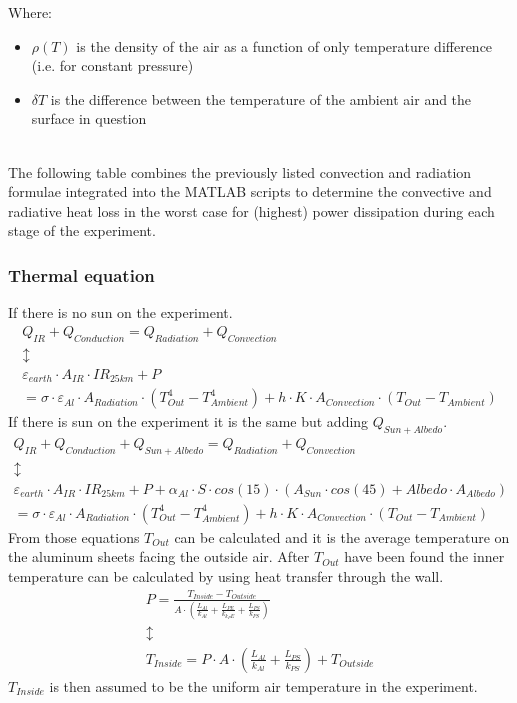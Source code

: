 Where:
\begin{itemize}
    \item $\rho(T)$ is the density of the air as a function of only temperature difference (i.e. for constant pressure)
    \item $\delta T$ is the difference between the temperature of the ambient air and the surface in question
\end{itemize} \\



The following table combines the previously listed convection and radiation formulae integrated into the MATLAB scripts to determine the convective and radiative heat loss in the worst case for (highest) power dissipation during each stage of the experiment.\\



\raggedbottom


\subsubsection{Thermal equation}
If there is no sun on the experiment.
\begin{gather*}
    Q_{IR} + Q_{Conduction} = Q_{Radiation} + Q_{Convection} \\
    \updownarrow \\
    \varepsilon_{earth} \cdot A_{IR} \cdot IR_{25km} + P \\ = \sigma \cdot \varepsilon_{Al} \cdot A_{Radiation} \cdot (T_{Out}^4 - T_{Ambient}^4 ) + h \cdot K \cdot A_{Convection} \cdot (T_{Out} - T_{Ambient})
\end{gather*}
If there is sun on the experiment it is the same but adding $Q_{Sun+Albedo}$.
\begin{gather*}
    Q_{IR} + Q_{Conduction} + Q_{Sun+Albedo} = Q_{Radiation} + Q_{Convection} \\
    \updownarrow \\
    \varepsilon_{earth} \cdot A_{IR} \cdot IR_{25km} + P + \alpha_{Al}\cdot S \cdot cos(15) \cdot (A_{Sun} \cdot cos(45) + Albedo \cdot A_{Albedo}) \\ = \sigma \cdot \varepsilon_{Al} \cdot A_{Radiation} \cdot (T_{Out}^4 - T_{Ambient}^4 ) + h \cdot K \cdot A_{Convection} \cdot (T_{Out} - T_{Ambient})
\end{gather*}
From those equations $T_{Out}$ can be calculated and it is the average temperature on the aluminum sheets facing the outside air.
After $T_{Out}$ have been found the inner temperature can be calculated by using heat transfer through the wall.
\begin{gather*}
    P = \frac{T_{Inside} - T_{Outside}}{A \cdot (\frac{L_{Al}}{k_{Al}} + \frac{L_{PE}}{k_{k_PE}} + \frac{L_{PS}}{k_{PS}})} \\
     \updownarrow \\
    T_{Inside} = P \cdot A \cdot (\frac{L_{Al}}{k_{Al}} + \frac{L_{PS}}{k_{PS}}) + T_{Outside}
\end{gather*}
$T_{Inside}$ is then assumed to be the uniform air temperature in the experiment.



